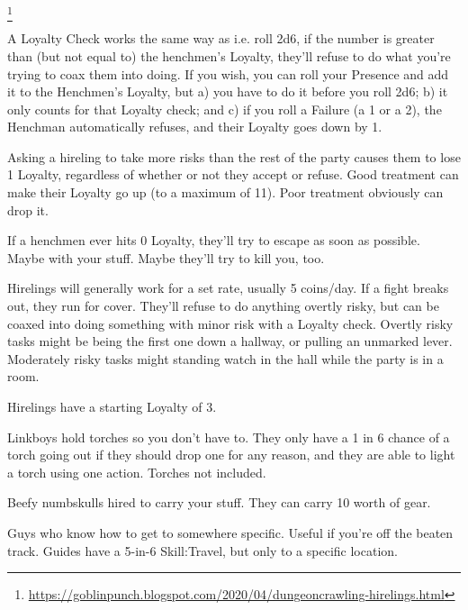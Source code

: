 {\begin{multicols}{2}

    \setcounter{footnote}{0}
    \footnote{\url{https://goblinpunch.blogspot.com/2020/04/dungeoncrawling-hirelings.html}{}}


    A Loyalty Check works the same way as  i.e. roll 2d6, if the number is greater than (but not equal to) the henchmen's Loyalty, they'll refuse to do what you're trying to coax them into doing.  If you wish, you can roll your Presence \UD and add it to the Henchmen's Loyalty, but a) you have to do it before you roll 2d6; b) it only counts for that Loyalty check;  and c) if you roll a Failure (a 1 or a 2), the Henchman automatically refuses, and their Loyalty goes down by 1.

    Asking a hireling to take more risks than the rest of the party causes them to lose 1 Loyalty, regardless of whether or not they accept or refuse. Good treatment can make their Loyalty go up (to a maximum of 11).  Poor treatment obviously can drop it.

    If a henchmen ever hits 0 Loyalty, they'll try to escape as soon as possible.  Maybe with your stuff.  Maybe they'll try to kill you, too.



    Hirelings will generally work for a set rate, usually 5 coins/day.  If a fight breaks out, they run for cover. They'll refuse to do anything overtly risky, but can be coaxed into doing something with minor risk with a Loyalty check.  Overtly risky tasks might be being the first one down a hallway, or pulling an unmarked lever. Moderately risky tasks might standing watch in the hall while the party is in a room.

    Hirelings have a starting Loyalty of 3.

    Linkboys hold torches so you don't have to. They only have a 1 in 6 chance of a torch going out if they should drop one for any reason, and they are able to light a torch using one action.  Torches not included.

    Beefy numbskulls hired to carry your stuff. They can carry 10  worth of gear.

    Guys who know how to get to somewhere specific. Useful if you're  off the beaten track. Guides have a 5-in-6 Skill:Travel, but only to a specific location.


\end{multicols}}
